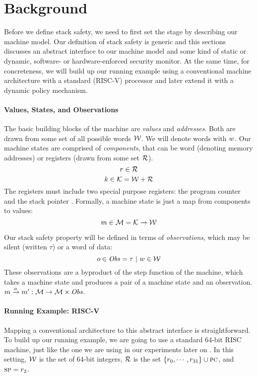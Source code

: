 \documentclass[acmsmall,review,anonymous]{acmart}\settopmatter{printfolios=true,printccs=false,printacmref=false}
\begin{document}
\section{Background}
\label{sec:prelim}

Before we define stack safety, we need to first set the stage by
describing our machine model. Our definition of stack safety is
generic and this sections discusses an abstract interface to our
machine model and some kind of static or dynamic, software- or
hardware-enforced security monitor. At the same time, for
concreteness, we will build up our running example using a
conventional machine architecture with a standard (RISC-V) processor
and later extend it with a dynamic policy mechanism.

\paragraph*{Values, States, and Observations}

The basic building blocks of the machine are {\em values} and {\em
  addresses}. Both are drawn from some set of all possible words
${\mathcal W}$. We will denote words with $w$.
%
Our machine states are comprised of {\em components}, that can be word
(denoting memory addresses) or registers (drawn from some set ${\mathcal R}$).
%
    \[r \in {\mathcal R}\]
    \[k \in {\mathcal K} = {\mathcal W} + {\mathcal R} \]
%
The registers must include two special purpose registers: the program
counter {\PCname} and the stack pointer \SP.
%
Formally, a machine state is just a map from components to values:
%
\[m \in {\mathcal M} = {\mathcal K} \rightarrow {\mathcal W}\]

Our stack safety property will be defined in terms of {\em
  observations}, which may be silent (written $\tau$) or a word of
data:
%
\[o \in \mathit{Obs} = \tau ~ | ~ w \in {\mathcal W}\]
%
These observations are a byproduct of the step function of the
machine, which takes a machine state and produces a pair of a
machine state and an observation.
%
\(m \xrightarrow{o} m' : {\mathcal M} \rightarrow {\mathcal M} \times \mathit{Obs} \).

\paragraph*{Running Example: RISC-V}

Mapping a conventional architecture to this abstract interface is
straightforward. To build up our running example, we are going to use
a standard 64-bit RISC machine, just like the one we are using in our
experiments later on . In this setting, ${\mathcal W}$
is the set of 64-bit integers, ${\mathcal R}$ is the set $\{r_0, \cdots,
r_{31}\} \cup {\textsc{pc}}$, and $\textsc{sp} = r_2$. 
\end{document}
